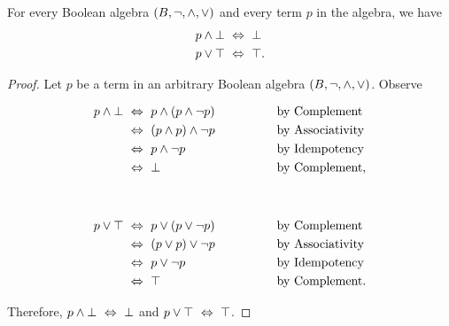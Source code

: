 \begin{theorem}[Domination]
    For every Boolean algebra $(B, \neg, \wedge, \vee)$ and every term $p$ in the algebra,
    we have
    \begin{align*}
        p \wedge \bot &~\Leftrightarrow~ \bot\\
        p \vee \top &~\Leftrightarrow~ \top.
    \end{align*}
\end{theorem}
\begin{proof}
    Let $p$ be a term in an arbitrary Boolean algebra $(B, \neg, \wedge, \vee)$.
    Observe
    \begin{center}
        \begin{minipage}{.45\linewidth}
            \begin{alignat*}{2}
                p \wedge \bot &~\Leftrightarrow~ p \wedge (p \wedge \neg p)~~~~~~~~~~~~&&\text{by Complement}\\
                             &~\Leftrightarrow~ (p \wedge p) \wedge \neg p &&\text{by Associativity}\\
                             &~\Leftrightarrow~ p \wedge \neg p &&\text{by Idempotency}\\
                             &~\Leftrightarrow~ \bot &&\text{by Complement},
            \end{alignat*}
        \end{minipage}%
        \begin{minipage}{.1\linewidth}
            ~
        \end{minipage}%
        \begin{minipage}{.45\linewidth}
            \begin{alignat*}{2}
                p \vee \top &~\Leftrightarrow~ p \vee (p \vee \neg p)~~~~~~~~~~~~&&\text{by Complement}\\
                             &~\Leftrightarrow~ (p \vee p) \vee \neg p &&\text{by Associativity}\\
                             &~\Leftrightarrow~ p \vee \neg p &&\text{by Idempotency}\\
                             &~\Leftrightarrow~ \top &&\text{by Complement}.
            \end{alignat*}
        \end{minipage}
    \end{center}
    Therefore, $p \wedge \bot ~\Leftrightarrow~ \bot$ and $p \vee \top ~\Leftrightarrow~ \top$.
\end{proof}

